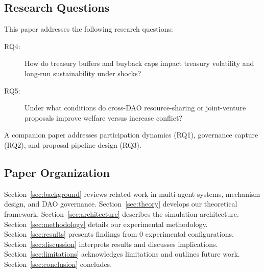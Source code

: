 \subsection{Research Questions}

This paper addresses the following research questions:

\begin{description}
    \item[RQ4:] How do treasury buffers and buyback caps impact treasury volatility and long-run sustainability under shocks?
    \item[RQ5:] Under what conditions do cross-DAO resource-sharing or joint-venture proposals improve welfare versus increase conflict?
\end{description}

\noindent A companion paper addresses participation dynamics (RQ1), governance capture (RQ2), and proposal pipeline design (RQ3).

\subsection{Paper Organization}

Section~\ref{sec:background} reviews related work in multi-agent systems, mechanism design, and DAO governance. Section~\ref{sec:theory} develops our theoretical framework. Section~\ref{sec:architecture} describes the simulation architecture. Section~\ref{sec:methodology} details our experimental methodology. Section~\ref{sec:results} presents findings from 0 experimental configurations. Section~\ref{sec:discussion} interprets results and discusses implications. Section~\ref{sec:limitations} acknowledges limitations and outlines future work. Section~\ref{sec:conclusion} concludes.
